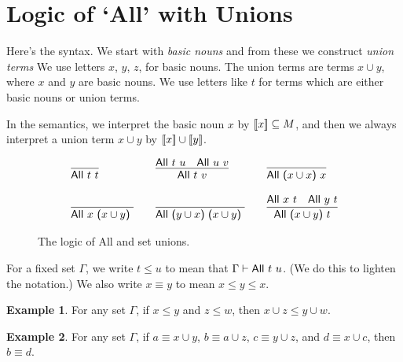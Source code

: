 \documentclass[12pt]{article}
\theoremstyle{definition}
\newtheorem{example}{Example}
\newcommand{\semantics}[1]{[\![\mbox{\em $ #1 $\/}]\!]}
\newcommand{\proves}{\vdash}
\newlength{\mathfrwidth}
\newenvironment{mathframe}
    {\begin{lrbox}{\mathfrbox}\begin{minipage}{\mathfrwidth}\begin{center}}
    {\end{center}\end{minipage}\end{lrbox}\noindent\fbox{\usebox{\mathfrbox}}}
\begin{document}

\section{Logic of `All' with Unions}

Here's the syntax.   We start with \emph{basic nouns} and from these we construct \emph{union terms}
We
use letters $x$, $y$, $z$, for basic nouns.  The union terms are terms $x\cup y$, where $x$ and $y$ are basic nouns.
We use letters like $t$ for terms which are either basic nouns  or union terms.

In the semantics, we interpret the basic noun $x$ by $\semantics{x}\subseteq M$, and then we always interpret a union term $x\cup y$ by 
$\semantics{x}\cup\semantics{y}$.

\begin{figure}[t]
\begin{mathframe}
\[
\begin{array}{l@{\qquad}l@{\qquad}l}
\infer{\mbox{\sf All $t$ $t$}}{}
&
\infer{\mbox{\sf All $t$ $v$}}{\mbox{\sf All $t$ $u$} & \mbox{\sf All $u$ $v$}}
&
\infer{\mbox{\sf All ($x\cup x$) $x$}}{}  \\  \\
\infer{\mbox{\sf All $x$ ($x\cup y$) }}{} &
\infer{\mbox{\sf All ($y \cup x$) ($x\cup y$) }}{} &
\infer{\mbox{\sf All ($x\cup y$) $t$}}{\mbox{\sf All $x$ $t$} & \mbox{\sf All $y$ $t$}}
\end{array}
\]
\caption{The logic of {\sf All} and set unions.\label{fig-all-unions-1}}
\end{mathframe}
\end{figure}

For a fixed set $\Gamma$, we write $t\leq u$ to mean that $\Gamma\proves \mbox{\sf All $t$ $u$}$.
(We do this to lighten the notation.)    We also write $x \equiv y$ to mean $x\leq y \leq x$.

\begin{example}
For any set $\Gamma$, if $x\leq y$ and $z\leq w$, then $x\cup z \leq y\cup w$.
\label{ex-1}
\end{example}

\begin{example}
For any set $\Gamma$, if $a\equiv x\cup y$, $b\equiv a\cup z$, 
$c \equiv y \cup z$, and $d \equiv x \cup c$, then $b \equiv d$.
\label{ex-2}
\end{example}
\end{document}
